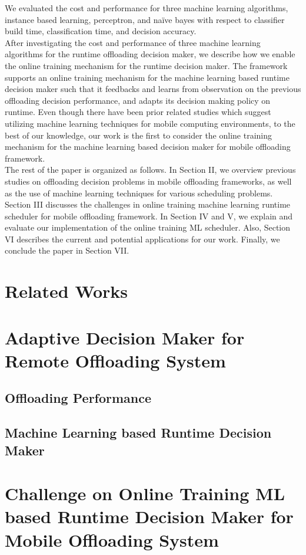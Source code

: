\documentclass[10pt, conference, compsocconf]{IEEEtran}
\begin{document}
%
We evaluated the cost and performance for three machine learning
algorithms, instance based learning, perceptron, and na\"{i}ve bayes with
respect to classifier build time, classification time, and decision
accuracy.\\
%
\indent After investigating the cost and performance of three machine 
learning algorithms for the runtime offloading decision maker, we
describe how we enable the online training mechanism for the runtime
decision maker.
%
The framework supports an online training mechanism for the
machine learning based runtime decision maker such that it feedbacks and 
learns from observation on the previous offloading decision
performance, and adapts its decision making policy on runtime.
%
Even though there have been prior related studies which suggest
utilizing machine learning techniques for mobile computing environments,
to the best of our knowledge, our work is the first to consider the
online training mechanism for the machine learning based decision maker
for mobile offloading framework.\\   
%
\indent The rest of the paper is organized  as follows.
%
In Section II, we overview previous studies on offloading decision
problems in mobile offloading frameworks, as well as the use of machine
learning techniques for various scheduling problems.
%
Section III discusses the challenges in online training machine learning
runtime scheduler for mobile offloading framework.
%
In Section IV and V, we explain and evaluate our implementation of the
online training ML scheduler.
%
Also, Section VI describes the current and potential applications for
our work.
%
Finally, we conclude the paper in Section VII.
%
\section{Related Works}
%
\section{Adaptive Decision Maker for Remote Offloading System}
%
\subsection{Offloading Performance}
%
\subsection{Machine Learning based Runtime Decision Maker}
%
\section{Challenge on Online Training ML based Runtime Decision Maker
for Mobile Offloading System}
%
\end{document}

